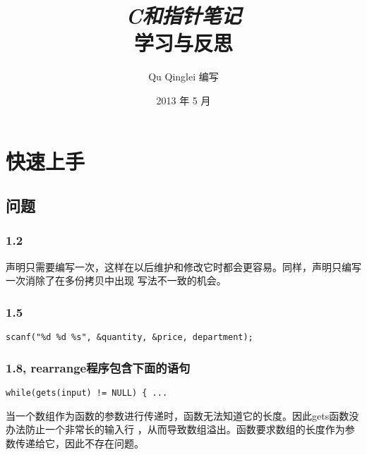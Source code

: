 \documentclass{article}
\begin{document}
\title{%
  {\huge \textit{C和指针笔记}\\\smallskip}%
  {\LARGE \textsf{学习与反思}}
}

\author{Qu Qinglei 编写 \\[3mm]
       }

\date{2013 年 5 月}

\maketitle

\begin{multicols}{2}
\tableofcontents
\end{multicols}

\section{快速上手}
\subsection{问题}
\subsubsection{1.2}
声明只需要编写一次，这样在以后维护和修改它时都会更容易。同样，声明只编写一次消除了在多份拷贝中出现
写法不一致的机会。

\subsubsection{1.5}
\begin{verbatim}
scanf("%d %d %s", &quantity, &price, department);
\end{verbatim}

\subsubsection{1.8, rearrange程序包含下面的语句}
\begin{verbatim}
while(gets(input) != NULL) { ...
\end{verbatim}
当一个数组作为函数的参数进行传递时，函数无法知道它的长度。因此gets函数没办法防止一个非常长的输入行
，从而导致数组溢出。函数要求数组的长度作为参数传递给它，因此不存在问题。
\end{document}
